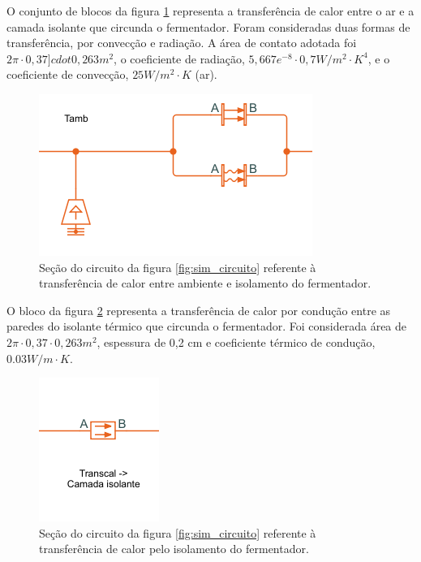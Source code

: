 O conjunto de blocos da figura \ref{fig:transcal_amb} representa a transferência de calor entre o ar e a camada isolante que circunda o fermentador. Foram consideradas duas formas de transferência, por convecção e radiação. A área de contato adotada foi \(2 \pi \cdot 0,37 ]cdot 0,263 m^2\), o coeficiente de radiação, \( 5,667 e^{-8} \cdot 0,7 W / m^2 \cdot K^4 \), e o coeficiente de convecção, \(25 W /m^2 \cdot K\) (ar).

\begin{figure}[H]
    \centering
    \includegraphics[scale=0.6]{figuras/projeto/controle/transcal_amb.png}
    \caption{Seção do circuito da figura \ref{fig:sim_circuito} referente à transferência de calor entre ambiente e isolamento do fermentador.}
    \label{fig:transcal_amb}
\end{figure}


O bloco da figura \ref{fig:transcal_isolante} representa a transferência de calor por condução entre as paredes do isolante térmico que circunda o fermentador. Foi considerada área de \(2\pi \cdot 0,37 \cdot 0,263 m^2\), espessura de 0,2 cm e coeficiente térmico de condução, \(0.03 W / m \cdot K\).

\begin{figure}[H]
    \centering
    \includegraphics[scale=0.8]{figuras/projeto/controle/transcal_isolante.png}
    \caption{Seção do circuito da figura \ref{fig:sim_circuito} referente à transferência de calor pelo isolamento do fermentador.}
    \label{fig:transcal_isolante}
\end{figure}


